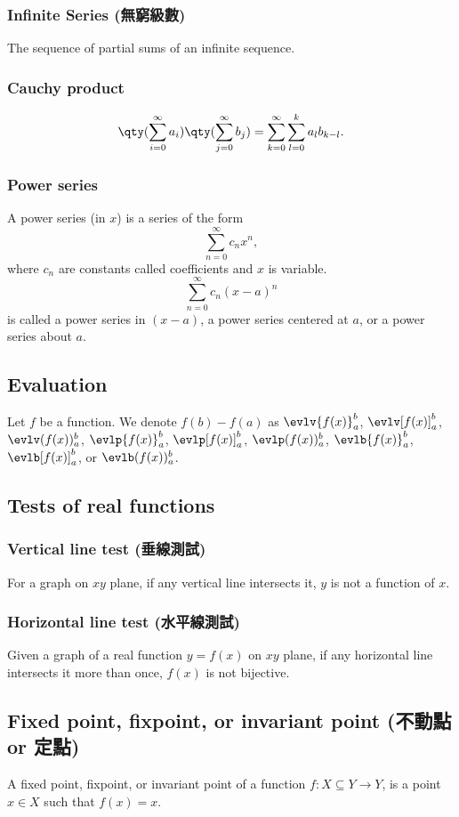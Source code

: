 \documentclass[a4paper,12pt]{report}
\begin{document}
\subsubsection{Infinite Series (無窮級數)}
The sequence of partial sums of an infinite sequence.
\subsubsection{Cauchy product}
\[\qty(\sum_{i=0}^{\infty}a_i)\qty(\sum_{j=0}^{\infty}b_j)=\sum_{k=0}^{\infty}\sum_{l=0}^ka_lb_{k-l}.\]
\subsubsection{Power series}
A power series (in $x$) is a series of the form
\[\sum_{n=0}^{\infty}c_nx^n,\]
where $c_n$ are constants called coefficients and $x$ is variable.
\[\sum_{n=0}^{\infty}c_n(x-a)^n\]
is called a power series in $(x-a)$, a power series centered at $a$, or a power series about $a$.
\subsection{Evaluation}
Let $f$ be a function. We denote $f(b)-f(a)$ as $\evlv{f(x)}_a^b$, $\evlv[f(x)]_a^b$, $\evlv(f(x))_a^b$, $\evlp{f(x)}_a^b$, $\evlp[f(x)]_a^b$, $\evlp(f(x))_a^b$, $\evlb{f(x)}_a^b$, $\evlb[f(x)]_a^b$, or $\evlb(f(x))_a^b$.
\subsection{Tests of real functions}
\subsubsection{Vertical line test (垂線測試)}
For a graph on $xy$ plane, if any vertical line intersects it, $y$ is not a function of $x$.
\subsubsection{Horizontal line test (水平線測試)}
Given a graph of a real function $y=f(x)$ on $xy$ plane, if any horizontal line intersects it more than once, $f(x)$ is not bijective.
\subsection{Fixed point, fixpoint, or invariant point (不動點 or 定點)}
A fixed point, fixpoint, or invariant point of a function $f\colon X\subseteq Y\to Y$, is a point $x\in X$ such that $f(x)=x$.
\end{document}

